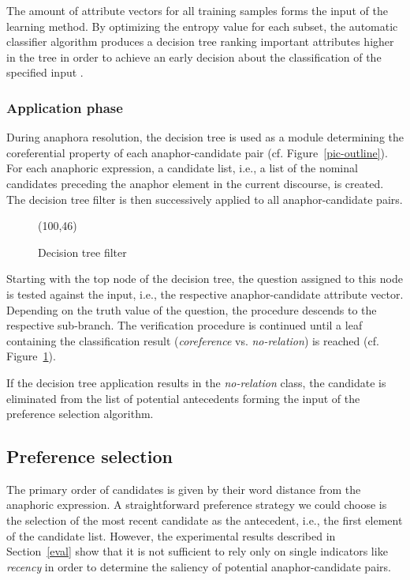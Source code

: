 The amount of attribute vectors for all training samples forms the input of the learning
method. By optimizing the entropy value for each subset, the automatic classifier algorithm
produces a decision tree ranking important attributes higher in the tree in order to achieve
an early decision about the classification of the specified input \cite{Quinlan93}.
\vspace*{-0.25em}

\subsubsection{Application phase}
\label{dt-apply}

During anaphora resolution, the decision tree is used as a module determining the
coreferential property of each anaphor-candidate pair (cf. Figure~\ref{pic-outline}).
For each anaphoric expression, a candidate list, i.e., a list of the nominal candidates preceding
the anaphor element in the current discourse, is created.
The decision tree filter is then successively applied to all anaphor-candidate pairs.

\begin{figure}[ht]
  \vspace*{-1.75\baselineskip}
  \begin{center}
\atari(100,46)
    \caption{Decision tree filter}\label{pic-dt}
  \vspace*{-1.5\baselineskip}
  \end{center}
\end{figure}

Starting with the top node of the decision tree, the question assigned to this node is
tested against the input, i.e., the respective anaphor-candidate attribute vector.
Depending on the truth value of the question, the procedure descends to the respective sub-branch.
The verification procedure is continued until a leaf containing the classification result 
({\em coreference} vs. {\em no-relation}) is reached (cf. Figure~\ref{pic-dt}).

If the decision tree application results in the {\em no-relation} class, the candidate is
eliminated from the list of potential antecedents forming the input of the
preference selection algorithm.

\subsection{Preference selection}
\label{pref}

The primary order of candidates is given by their word distance from the anaphoric expression.
A straightforward preference strategy we could choose is the selection of the most recent
candidate as the antecedent, i.e., the first element of the candidate list.
However, the experimental results described in Section~\ref{eval} show that it is not sufficient
to rely only on single indicators like {\em recency} in order to determine the saliency of potential
anaphor-candidate pairs.

